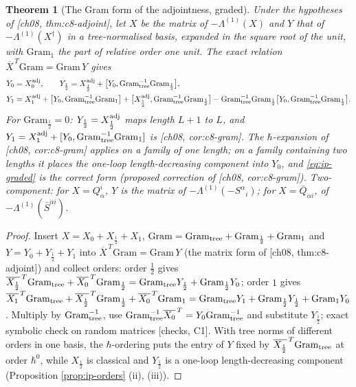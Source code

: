 \documentclass[11pt]{report}
\theoremstyle{plain}
\newtheorem{theorem}{Theorem}[chapter]
\theoremstyle{definition}
\numberwithin{equation}{chapter}
\newcommand{\Gt}{\mathrm{Gram}_{\rm tree}}
\newcommand{\Go}{\mathrm{Gram}_{1}}
\begin{document}
\begin{theorem}[The Gram form of the adjointness, graded]
\label{thm:ip-graded}
Under the hypotheses of [ch08, thm:c8-adjoint], let $X$ be the matrix of $-\Lambda^{(1)}(X)$ and $Y$ that of $-\Lambda^{(1)}(X^\dagger)$ in a tree-normalised basis, expanded in the square root of the unit, with $\Go$ the part of relative order one unit. The exact relation $\overline X^{\,T}\mathrm{Gram}=\mathrm{Gram}\,Y$ gives
\begin{equation}
\begin{aligned}
&Y_0=X_0^{\rm adj},\qquad Y_{\frac12}=X_{\frac12}^{\rm adj}+\big[Y_0,\Gt^{-1}\mathrm{Gram}_{\frac12}\big],\\
&Y_1=X_1^{\rm adj}+\big[Y_0,\Gt^{-1}\Go\big]+\big[X_{\frac12}^{\rm adj},\Gt^{-1}\mathrm{Gram}_{\frac12}\big]-\Gt^{-1}\mathrm{Gram}_{\frac12}\big[Y_0,\Gt^{-1}\mathrm{Gram}_{\frac12}\big].
\end{aligned}
\label{eq:ip-graded}
\end{equation}
For $\mathrm{Gram}_{\frac12}=0$: $Y_{\frac12}=X_{\frac12}^{\rm adj}$ maps length $L+1$ to $L$, and $Y_1=X_1^{\rm adj}+[Y_0,\Gt^{-1}\Go]$ is [ch08, cor:c8-gram]. The $\hbar$-expansion of [ch08, cor:c8-gram] applies on a family of one length; on a family containing two lengths it places the one-loop length-decreasing component into $Y_0$, and \eqref{eq:ip-graded} is the correct form (proposed correction of [ch08, cor:c8-gram]). Two-component: for $X=Q^i_\alpha$, $Y$ is the matrix of $-\Lambda^{(1)}(-S^\alpha{}_i)$; for $X=\bar Q_{\dot\alpha i}$, of $-\Lambda^{(1)}(\bar S^{\dot\alpha i})$.
\end{theorem}

\begin{proof}
Insert $X=X_0+X_{\frac12}+X_1$, $\mathrm{Gram}=\Gt+\mathrm{Gram}_{\frac12}+\Go$ and $Y=Y_0+Y_{\frac12}+Y_1$ into $\overline X^{\,T}\mathrm{Gram}=\mathrm{Gram}\,Y$ (the matrix form of [ch08, thm:c8-adjoint]) and collect orders: order $\tfrac12$ gives $\overline{X_{\frac12}}^{\,T}\Gt+\overline{X_0}^{\,T}\mathrm{Gram}_{\frac12}=\Gt Y_{\frac12}+\mathrm{Gram}_{\frac12}Y_0$; order $1$ gives $\overline{X_1}^{\,T}\Gt+\overline{X_{\frac12}}^{\,T}\mathrm{Gram}_{\frac12}+\overline{X_0}^{\,T}\Go=\Gt Y_1+\mathrm{Gram}_{\frac12}Y_{\frac12}+\Go Y_0$. Multiply by $\Gt^{-1}$, use $\Gt^{-1}\overline{X_0}^{\,T}=Y_0\Gt^{-1}$ and substitute $Y_{\frac12}$; exact symbolic check on random matrices [checks, C1]. With tree norms of different orders in one basis, the $\hbar$-ordering puts the entry of $Y$ fixed by $\overline{X_{\frac12}}^{\,T}\Gt$ at order $\hbar^0$, while $X_{\frac12}$ is classical and $Y_{\frac12}$ is a one-loop length-decreasing component (Proposition \ref{prop:ip-orders} (ii), (iii)).
\end{proof}
\end{document}

